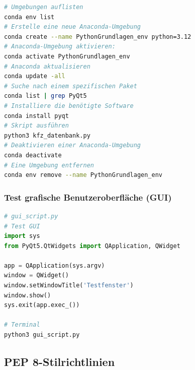 \documentclass{vorlage-design-main}
\begin{document}
\begin{lstlisting}[language=bash]
# Umgebungen auflisten
conda env list
# Erstelle eine neue Anaconda-Umgebung
conda create --name PythonGrundlagen_env python=3.12
# Anaconda-Umgebung aktivieren:
conda activate PythonGrundlagen_env
# Anaconda aktualisieren
conda update -all
# Suche nach einem spezifischen Paket
conda list | grep PyQt5
# Installiere die benötigte Software
conda install pyqt
# Skript ausführen
python3 kfz_datenbank.py
# Deaktivieren einer Anaconda-Umgebung
conda deactivate
# Eine Umgebung entfernen
conda env remove --name PythonGrundlagen_env
\end{lstlisting}

\subsubsection{Test grafische Benutzeroberfläche
(GUI)}\label{test-grafische-benutzeroberflaeche-gui}

\begin{lstlisting}[language=Python]
# gui_script.py
# Test GUI
import sys
from PyQt5.QtWidgets import QApplication, QWidget

app = QApplication(sys.argv)
window = QWidget()
window.setWindowTitle('Testfenster')
window.show()
sys.exit(app.exec_())

# Terminal
python3 gui_script.py
\end{lstlisting}

\subsection{PEP 8-Stilrichtlinien}\label{pep-8-stilrichtlinien}
\end{document}

